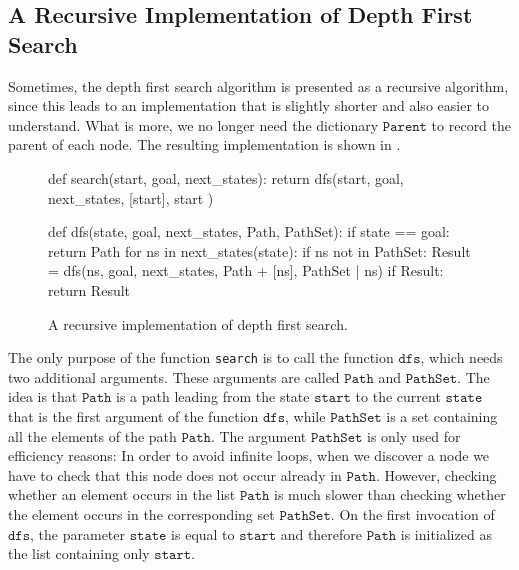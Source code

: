 \subsection{A Recursive Implementation of Depth First Search}
Sometimes, the depth first search algorithm is presented as a recursive algorithm, since this leads
to an implementation that is slightly shorter and also easier to understand.  What is more, we no
longer need the dictionary $\texttt{Parent}$ to record the parent of each node.  The resulting
implementation is shown in .

\begin{figure}[!ht]
\centering
\begin{python3code}
def search(start, goal, next_states):
    return dfs(start, goal, next_states, [start], { start })

def dfs(state, goal, next_states, Path, PathSet):
    if state == goal:
        return Path
    for ns in next_states(state):
        if ns not in PathSet:
            Result = dfs(ns, goal, next_states, Path + [ns], PathSet | {ns})
            if Result:
                return Result
\end{python3code}
\vspace*{-0.3cm}
\caption{A recursive implementation of depth first search.}
\label{fig:Depth-First-Search.ipynb}
\end{figure}
The only purpose of the function \texttt{search} is to call the function $\texttt{dfs}$, which needs two
additional arguments.  These arguments are called $\texttt{Path}$ and $\texttt{PathSet}$.  The idea is that $\texttt{Path}$ is
a path leading from the state $\texttt{start}$ to the current $\texttt{state}$ that is the first
argument of the function $\texttt{dfs}$, while $\texttt{PathSet}$ is a set containing all the elements of the
path $\texttt{Path}$.  The argument $\texttt{PathSet}$ is only used for efficiency reasons:  In order to avoid
infinite loops, when we discover a node we have to check that this node does not occur already in $\texttt{Path}$.
However, checking whether an element occurs in the list $\texttt{Path}$ is much slower than checking whether
the element occurs in the corresponding set $\texttt{PathSet}$.  On the first invocation of $\texttt{dfs}$, the
parameter $\texttt{state}$ is equal to $\texttt{start}$ and therefore $\texttt{Path}$ is initialized
as the list containing only $\texttt{start}$.

